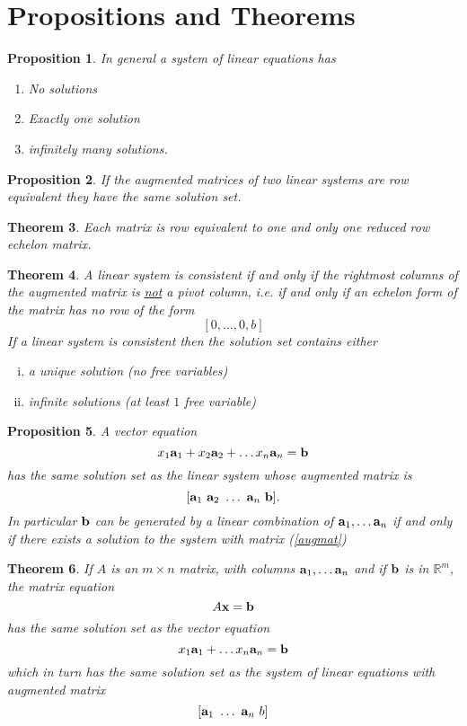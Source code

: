 \documentclass[12pt,letterpaper]{article}
\newcommand{\rr}{\mathbb R}     %
\newcommand{\x}{{\bf x}}
\renewcommand{\b}{{\bf b}}
\newcommand{\0}{{\bf 0}}
\renewcommand{\a}{{\bf a}}
\theoremstyle{plain}
\newtheorem{theorem}{Theorem}
\newtheorem{prop}[theorem]{Proposition}
\theoremstyle{definition}
\begin{document}
\section{Propositions and Theorems}
\begin{prop} In general a system of linear equations has 
\begin{enumerate}[1)]
\item No solutions
\item Exactly one solution
\item infinitely many solutions. 
\end{enumerate}
\end{prop}
\begin{prop} If the augmented matrices of two linear systems are row equivalent they have the same solution set. 
\end{prop}
\begin{theorem} Each matrix is row equivalent to one and only one reduced row echelon matrix.
\end{theorem}
\begin{theorem} A linear system is consistent if and only if the rightmost columns of the augmented matrix is \underline{not} a pivot column, i.e. if and only if an echelon form of the matrix has no row of the form
\[ [ 0,\ldots , 0, b]\]
If a linear system is consistent then the solution set contains either 
\begin{enumerate}[(i)]
\item a unique solution (no free variables) 
\item infinite solutions (at least $1$ free variable)
\end{enumerate}
\end{theorem}
\begin{prop} A vector equation 
\[x_1{\bf a}_1+x_2{\bf a}_2+\ldots x_n{\bf a}_n=\b\]
has the same solution set as the linear system whose augmented matrix is 
\begin{equation}\label{augmat}[{\bf a}_1\ {\bf a}_2\ \dots \ {\bf a}_n\ \b].\end{equation}
In particular $\b$ can be generated by a linear combination of ${\bf a}_1, \ldots {\bf a}_n$ if and only if there exists a solution to the system with matrix (\ref{augmat})
\end{prop}
\begin{theorem}If $A$ is an $m\times n$ matrix, with columns $\a_1, \ldots \a_n$ and if $\b$ is in $\rr^m$, the matrix equation 
\[A\x=\b\] has the same solution set as the vector equation 
\[x_1\a_1+\ldots x_n\a_n=\b\]
which in turn has the same solution set as the system of linear equations with augmented matrix
\[[\a_1\ \dots\ \a_n\ b]\]
\end{theorem}
\end{document}
